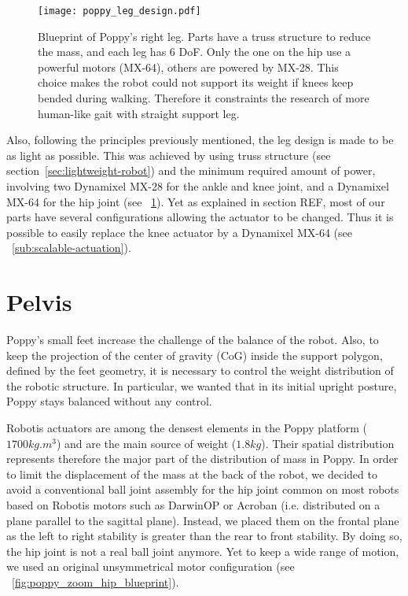 \begin{figure}[p]
    \centering
        \texttt{[image: poppy\_leg\_design.pdf]}
    \caption{Blueprint of Poppy's right leg. Parts have a truss structure to reduce the mass, and each leg has 6 DoF. Only the one on the hip use a powerful motors (MX-64), others are powered by MX-28. This choice makes the robot could not support its weight if knees keep bended during walking. Therefore it constraints the research of more human-like gait with straight support leg.}
    \label{fig:poppy_leg_design}
\end{figure}


Also, following the principles previously mentioned, the leg design is made to be as light as possible. This was achieved by using truss structure (see section~\ref{sec:lightweight-robot}) and the minimum required amount of power, involving two Dynamixel MX-28 for the ankle and knee joint, and a Dynamixel MX-64 for the hip joint (see \figurename~\ref{fig:poppy_leg_design}). Yet as explained in section REF, most of our parts have several configurations allowing the actuator to be changed. Thus it is possible to easily replace the knee actuator by a Dynamixel MX-64 (see \figurename~\ref{sub:scalable-actuation}).


\section{Pelvis} %
\label{sec:hip}


Poppy's small feet increase the challenge of the balance of the robot. Also, to keep the projection of the center of gravity (CoG) inside the support polygon, defined by the feet geometry, it is necessary to control the weight distribution of the robotic structure. In particular, we wanted that in its initial upright posture, Poppy stays balanced without any control.

Robotis actuators are among the densest elements in the Poppy platform ($ 1700 kg.m^{3} $) and are the main source of weight ($1.8 kg$). Their spatial distribution represents therefore the major part of the distribution of mass in Poppy. In order to limit the displacement of the mass at the back of the robot, we decided to avoid a conventional ball joint assembly for the hip joint common on most robots based on Robotis motors such as DarwinOP or Acroban (i.e. distributed on a plane parallel to the sagittal plane). Instead, we placed them on the frontal plane as the left to right stability is greater than the rear to front stability. By doing so, the hip joint is not a real ball joint anymore. Yet to keep a wide range of motion, we used an original unsymmetrical motor configuration (see \figurename~\ref{fig:poppy_zoom_hip_blueprint}).

